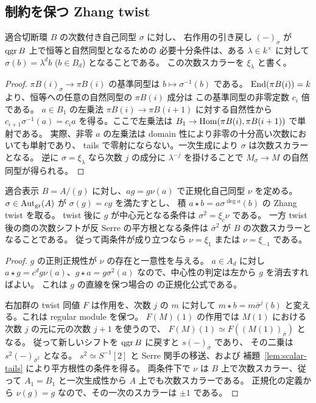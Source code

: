 

\subsection{制約を保つ Zhang twist}

\begin{lemma}
\label{lem:scalar-tails}
適合切断環 $B$ の次数付き自己同型 $\sigma$ に対し、
右作用の引き戻し $(-)_\sigma$ が $\operatorname{qgr} B$ 上で恒等と自然同型となるための
必要十分条件は、ある $\lambda\in k^\times$ に対して
$\sigma(b)=\lambda^d b$ ($b\in B_d$) となることである。
この次数スカラーを $\xi_\lambda$ と書く。
\end{lemma}
\begin{proof}
$\pi B(i)_\sigma\to\pi B(i)$ の基準同型は $b\mapsto\sigma^{-1}(b)$ である。
$\operatorname{End}(\pi B(i))=k$ より、恒等への任意の自然同型の $\pi B(i)$ 成分は
この基準同型の非零定数 $c_i$ 倍である。
$a\in B_1$ の左乗法 $\pi B(i)\to\pi B(i+1)$ に対する自然性から
$c_{i+1}\sigma^{-1}(a)=c_i a$ を得る。ここで左乗法は
$B_1\to\operatorname{Hom}(\pi B(i),\pi B(i+1))$ で単射である。
実際、非零 $a$ の左乗法は domain 性により非零の十分高い次数においても単射であり、
tails で零射にならない。一次生成により $\sigma$ は次数スカラーとなる。
逆に $\sigma=\xi_\lambda$ なら次数 $j$ の成分に $\lambda^{-j}$ を掛けることで
$M_\sigma\to M$ の自然同型が得られる。
\end{proof}

\begin{proposition}[固定表示での中心化と平方根性]
\label{prop:central-twist-obstruction}
適合表示 $B=A/(g)$ に対し、$ag=g\nu(a)$ で正規化自己同型 $\nu$ を定める。
$\sigma\in\operatorname{Aut}_{\mathrm{gr}}(A)$ が $\sigma(g)=c g$ を満たすとし、
積 $a\star b=a\sigma^{\deg a}(b)$ の Zhang twist を取る。
twist 後に $g$ が中心元となる条件は $\sigma^2=\xi_c\nu$ である。
一方 twist 後の商の次数シフトが反 Serre の平方根となる条件は
$\bar\sigma^2$ が $B$ の次数スカラーとなることである。
従って両条件が成り立つなら $\nu=\xi_1$ または $\nu=\xi_{-1}$ である。
\end{proposition}
\begin{proof}
$g$ の正則正規性が $\nu$ の存在と一意性を与える。
$a\in A_d$ に対し $a\star g=c^d g\nu(a)$、$g\star a=g\sigma^2(a)$
なので、中心性の判定は左から $g$ を消去すればよい。
これは $g$ の直線を保つ場合の
\cite[Remark 4.4]{MUW2026} の正規化公式である。

右加群の twist 同値 $F$ は作用を、次数 $j$ の $m$ に対して
$m\star b=m\bar\sigma^j(b)$ と変える。これは regular module を保つ。
$F(M)(1)$ の作用では $M(1)$ における次数 $j$ の元に元の次数 $j+1$ を使うので、
$F(M)(1)\simeq F((M(1))_{\bar\sigma})$ となる。
従って新しいシフトを $\operatorname{qgr} B$ に戻すと $s(-)_{\bar\sigma}$ であり、
その二乗は $s^2(-)_{\bar\sigma^2}$ となる。
$s^2\simeq S^{-1}[2]$ と Serre 関手の移送、および
補題~\ref{lem:scalar-tails} により平方根性の条件を得る。
両条件下で $\nu$ は $B$ 上で次数スカラー、従って
$A_1=B_1$ と一次生成性から $A$ 上でも次数スカラーである。
正規化の定義から $\nu(g)=g$ なので、その一次のスカラーは $\pm1$ である。
\end{proof}

